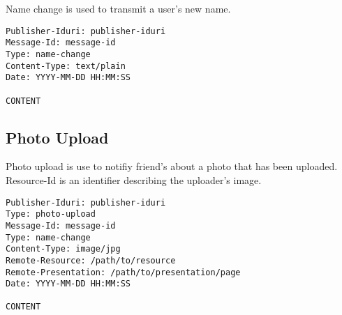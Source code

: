 \documentclass[letterpaper,11pt,oneside]{article}
\begin{document}
Name change is used to transmit a user's new name.

\vspace{10pt}
\begin{verbatim}
Publisher-Iduri: publisher-iduri
Message-Id: message-id
Type: name-change
Content-Type: text/plain
Date: YYYY-MM-DD HH:MM:SS

CONTENT
\end{verbatim}
\vspace{10pt}

\subsection{Photo Upload}

Photo upload is use to notifiy friend's about a photo that has been uploaded.
Resource-Id is an identifier describing the uploader's image.

\vspace{10pt}
\begin{verbatim}
Publisher-Iduri: publisher-iduri
Type: photo-upload
Message-Id: message-id
Type: name-change
Content-Type: image/jpg
Remote-Resource: /path/to/resource
Remote-Presentation: /path/to/presentation/page
Date: YYYY-MM-DD HH:MM:SS

CONTENT
\end{verbatim}
\vspace{10pt}
\end{document}

